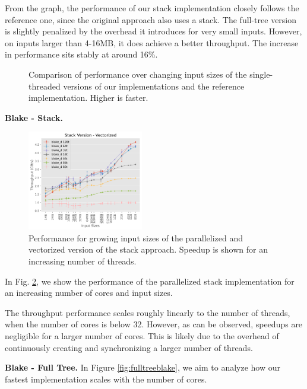 \documentclass[letterpaper]{article}
\newcommand{\mypar}[1]{{\bf #1.}}
\begin{document}
From the graph, the performance of our stack implementation closely follows the reference one, since the original approach also uses a stack. The full-tree version is slightly penalized by the overhead it introduces for very small inputs. However, on inputs larger than 4-16MB, it does achieve a better throughput. The increase in performance sits stably at around 16\%.

\begin{figure}[h]
\centering
	
	\caption{Comparison of performance over changing input sizes of the single-threaded versions of our implementations and the reference implementation. Higher is faster.
  \label{fig:singleblake}}
  \vspace{-5pt}
\end{figure}

\mypar{Blake - Stack}
\begin{figure}[h]
	\begin{center}
		\includegraphics[width=0.45\textwidth]{figures/stack_vec_plot.png}
	\end{center}
	\caption{Performance for growing input sizes of the parallelized and vectorized version of the stack approach. Speedup is shown for an increasing number of threads.}
 \label{fig:stack-multithread}
 \vspace{-5pt}
\end{figure}
In Fig. \ref{fig:stack-multithread}, we show the performance of the parallelized stack implementation for an increasing number of cores and input sizes. 

The throughput performance scales roughly linearly to the number of threads, when the number of cores is below 32. However, as can be observed, speedups are negligible for a larger number of cores. This is likely due to the overhead of continuously creating and synchronizing a larger number of threads.

\mypar{Blake - Full Tree}
In Figure \ref{fig:fulltreeblake}, we aim to analyze how our fastest implementation scales with the number of cores.
\end{document}
